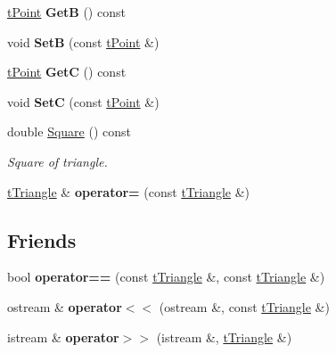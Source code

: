 \begin{DoxyCompactItemize}
\hyperlink{classtPoint}{t\+Point} {\bfseries GetB} () const
\item 
\mbox{\label{classtTriangle_a6c694e33bc770411e93a43fd4066e198}} 
void {\bfseries SetB} (const \hyperlink{classtPoint}{t\+Point} \&)
\item 
\mbox{\label{classtTriangle_a1f282bae86e8a7c0e0d03c1daa1203cf}} 
\hyperlink{classtPoint}{t\+Point} {\bfseries GetC} () const
\item 
\mbox{\label{classtTriangle_a918d25521066423811a5c8c6c065877d}} 
void {\bfseries SetC} (const \hyperlink{classtPoint}{t\+Point} \&)
\item 
\mbox{\label{classtTriangle_a97950f707d11df41c330fe3c9f87eefc}} 
double \hyperlink{classtTriangle_a97950f707d11df41c330fe3c9f87eefc}{Square} () const
\begin{DoxyCompactList}\small\item\em Square of triangle. \end{DoxyCompactList}\item 
\mbox{\label{classtTriangle_a130f7ecd50933a9dbcc1914fc4e31ac0}} 
\hyperlink{classtTriangle}{t\+Triangle} \& {\bfseries operator=} (const \hyperlink{classtTriangle}{t\+Triangle} \&)
\end{DoxyCompactItemize}
\subsection*{Friends}
\begin{DoxyCompactItemize}
\item 
\mbox{\label{classtTriangle_a95e318dd03b5dd2124a3b52fa6e5a398}} 
bool {\bfseries operator==} (const \hyperlink{classtTriangle}{t\+Triangle} \&, const \hyperlink{classtTriangle}{t\+Triangle} \&)
\item 
\mbox{\label{classtTriangle_a52e0f64418a864f97e0ef833d3c054c0}} 
ostream \& {\bfseries operator$<$$<$} (ostream \&, const \hyperlink{classtTriangle}{t\+Triangle} \&)
\item 
\mbox{\label{classtTriangle_a5b1b8bacb64f207e4d8c9bc5513c8335}} 
istream \& {\bfseries operator$>$$>$} (istream \&, \hyperlink{classtTriangle}{t\+Triangle} \&)
\end{DoxyCompactItemize}


